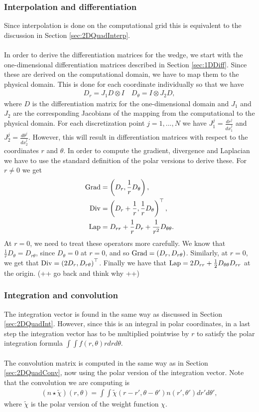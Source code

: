 \subsubsection{Interpolation and differentiation}
Since interpolation is done on the computational grid this is equivalent to the discussion in Section \ref{sec:2DQuadInterp}.
\\
\\
In order to derive the differentiation matrices for the wedge, we start with the one-dimensional differentiation matrices described in Section \ref{sec:1DDiff}. Since these are derived on the computational domain, we have to map them to the physical domain. This is done for each coordinate individually so that we have
\begin{align*}
	D_r = J_1D \otimes I \quad 	D_\theta =I \otimes J_2D,
\end{align*} 
where $D$ is the differentiation matrix for the one-dimensional domain and $J_1$ and $J_2$  are the corresponding Jacobians of the mapping from the computational to the physical domain. For each discretization point $j = 1,...,N$ we have $ J_1^j= \frac{dr^j}{dx_1^j}$ and $J_2^j = \frac{d\theta^j}{dx_2^j}$.
However, this will result in differentiation matrices with respect to the coordinates $r$ and $\theta$. In order to compute the gradient, divergence and Laplacian we have to use the standard definition of the polar versions to derive these. For $ r \neq 0$ we get
\begin{align*}
	\operatorname{Grad}  &= \left(D_r, \frac{1}{r} D_\theta\right) ,\\
	\operatorname{Div} &= \left(D_r + \frac{1}{r}, \frac{1}{r} D_\theta\right)^\top ,\\
	\operatorname{Lap}  &= D_{rr} +\frac{1}{r}D_r +  \frac{1}{r^2} D_{\theta \theta}.
\end{align*}
At $ r = 0$, we need to treat these operators more carefully. We know that $\frac{1}{r} D_\theta = D_{r\theta}$, since $D_\theta =0$ at $r = 0$, and so $ \operatorname{Grad} = \left(D_r, D_{r\theta}\right)$. Similarly, at $r = 0$, we get that $\operatorname{Div} = \left(2D_r, D_{r\theta}\right)^\top$. Finally we have that $\operatorname{Lap} = 2 D_{rr} + \frac{1}{2} D_{\theta\theta}D_{rr}$ at the origin. (++ go back and think why ++)


\subsubsection{Integration and convolution}
The integration vector is found in the same way as discussed in Section \ref{sec:2DQuadInt}. However, since this is an integral in polar coordinates, in a last step the integration vector has to be multiplied pointwise by $r$ to satisfy the polar integration formula $\int \int f(r, \theta) r dr d\theta$.
\\
\\
The convolution matrix is computed in the same way as in Section \ref{sec:2DQuadConv}, now using the polar version of the integration vector. 
Note that the convolution we are computing is
\begin{align*}
	\left(n \star \tilde \chi \right) (r, \theta) = \int \int \tilde \chi (r - r', \theta - \theta') n (r',\theta') d r' d\theta',
\end{align*}
where $\tilde \chi$ is the polar version of the weight function $\chi$.
